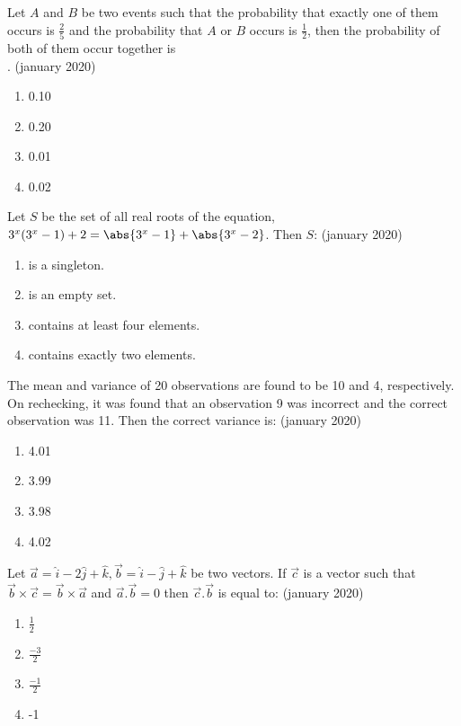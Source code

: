 \iffalse
\title{01-08-2020-shift-2-1-15}
\author{AI24BTECH11011}
\section{mcq-single}
\fi
    \item Let $A$ and $B$ be two events such that the probability that exactly one of them occurs is $\frac{2}{5}$ and the probability that $A$ or $B$ occurs is $\frac{1}{2}$, then the probability of both of them occur together is\\.
	    \hfill{(january 2020)}
	    \begin{enumerate}
	\item 0.10
        \item 0.20
        \item 0.01
        \item 0.02
    \end{enumerate}
    \item  Let $S$ be the set of all real roots of the equation, $3^x(3^x-1) + 2 = \abs{3^x-1} + \abs{3^x-2}$. Then $S$:
	    \hfill{(january 2020)}
    \begin{enumerate}
        \item is a singleton.
        \item is an empty set.
        \item contains at least four elements.
        \item contains exactly two elements.
    \end{enumerate}
    \item The mean and variance of 20 observations are found to be 10 and 4, respectively. On rechecking, it was found that an observation 9 was incorrect and the correct observation was 11. Then the correct variance is:
	    \hfill{(january 2020)}
		\begin{enumerate}
        \item 4.01
        \item 3.99
        \item 3.98
        \item 4.02
    \end{enumerate}
    \item Let $\vec{a}=\hat{i}-2\hat{j}+\hat{k},\vec{b}=\hat{i}-\hat{j}+\hat{k}$ be two vectors. If $\vec{c}$ is a vector such that $\vec{b}\times\vec{c} = \vec{b} \times \vec{a}$ and $\vec{a}.\vec{b}=0$ then $\vec{c}.\vec{b}$ is equal to:
	    \hfill{(january 2020)}
	    \begin{enumerate}
        \item $\frac{1}{2}$
        \item $\frac{-3}{2}$
        \item $\frac{-1}{2}$
        \item -1
    \end{enumerate}
